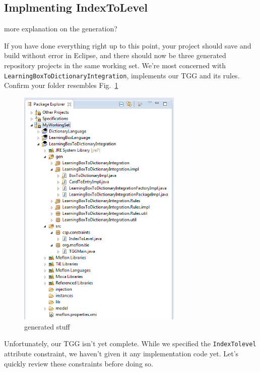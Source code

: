 \newpage
\hypertarget{rules common}{}
\subsection{Implmenting IndexToLevel}
\genHeader

\update more explanation on the generation?

If you have done everything right up to this point, your project should save and build without error in Eclipse, and there should now be three generated
repository projects in the same working set. We're most concerned with \texttt{LearningBox\-To\-Dictionary\-Integration}, implements our TGG and its
rules. Confirm your folder resembles Fig.~\ref{fig:tggGenerated}


\begin{figure}[htbp]
\begin{center}
  \includegraphics[width=0.7\textwidth]{eclipse_generatedTGG}
  \caption{generated stuff}
  \label{fig:tggGenerated}
\end{center}
\end{figure}

Unfortunately, our TGG isn't yet complete. While we specified the \texttt{IndexTolevel} attribute constraint, we haven't given it any implementation code yet.
Let's quickly review these constraints before doing so.

